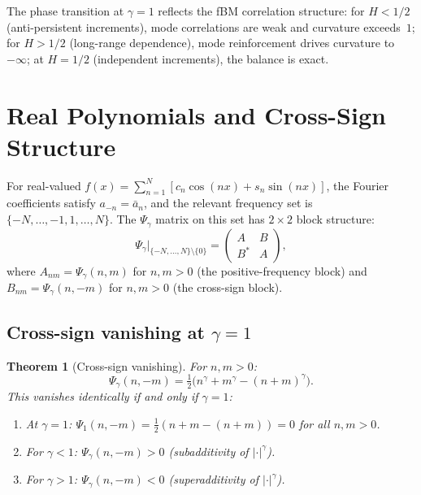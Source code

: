 \documentclass[11pt,a4paper]{article}
\theoremstyle{plain}
\newtheorem{theorem}{Theorem}[section]
\theoremstyle{definition}
\theoremstyle{remark}
\begin{document}
The phase transition at $\gamma = 1$ reflects the fBM correlation
structure: for $H < 1/2$ (anti-persistent increments), mode
correlations are weak and curvature exceeds~$1$; for $H > 1/2$
(long-range dependence), mode reinforcement drives curvature
to $-\infty$; at $H = 1/2$ (independent increments), the balance
is exact.


\section{Real Polynomials and Cross-Sign Structure}\label{sec:real}

For real-valued $f(x) = \sum_{n=1}^N [c_n\cos(nx) + s_n\sin(nx)]$,
the Fourier coefficients satisfy $a_{-n} = \bar{a}_n$, and the relevant
frequency set is $\{-N,\ldots,-1,1,\ldots,N\}$. The $\Psi_\gamma$ matrix
on this set has $2 \times 2$ block structure:
\begin{equation}\label{eq:block}
  \Psi_\gamma\Big|_{\{-N,\ldots,N\} \setminus \{0\}}
  = \begin{pmatrix} A & B \\ B^* & A \end{pmatrix},
\end{equation}
where $A_{nm} = \Psi_\gamma(n,m)$ for $n,m > 0$ (the positive-frequency
block) and $B_{nm} = \Psi_\gamma(n,-m)$ for $n,m > 0$ (the cross-sign
block).


\subsection{Cross-sign vanishing at $\gamma = 1$}\label{sec:cross-sign}

\begin{theorem}[Cross-sign vanishing]\label{thm:cross-sign}
For $n,m > 0$:
\begin{equation}\label{eq:cross-sign}
  \Psi_\gamma(n,-m) = \tfrac{1}{2}\bigl(n^\gamma + m^\gamma
  - (n+m)^\gamma\bigr).
\end{equation}
This vanishes identically if and only if $\gamma = 1$:
\begin{enumerate}[label=(\alph*)]
\item At $\gamma = 1$: $\Psi_1(n,-m)
  = \tfrac{1}{2}(n + m - (n+m)) = 0$ for all $n,m > 0$.
\item For $\gamma < 1$: $\Psi_\gamma(n,-m) > 0$
  (subadditivity of $|\cdot|^\gamma$).
\item For $\gamma > 1$: $\Psi_\gamma(n,-m) < 0$
  (superadditivity of $|\cdot|^\gamma$).
\end{enumerate}
\end{theorem}
\end{document}
